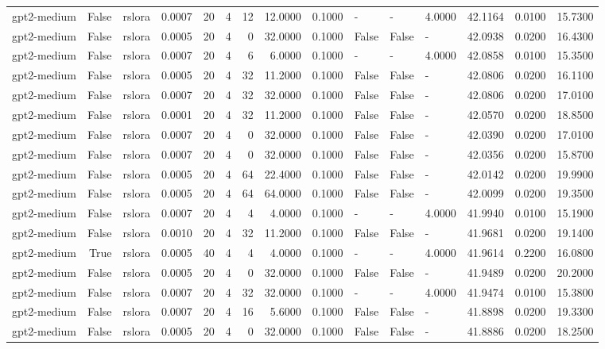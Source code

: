\begin{tabular}{lrlrrrrrrlllrrr}
gpt2-medium & False & rslora & 0.0007 & 20 & 4 & 12 & 12.0000 & 0.1000 & - & - & 4.0000 & 42.1164 & 0.0100 & 15.7300 \\
gpt2-medium & False & rslora & 0.0005 & 20 & 4 & 0 & 32.0000 & 0.1000 & False & False & - & 42.0938 & 0.0200 & 16.4300 \\
gpt2-medium & False & rslora & 0.0007 & 20 & 4 & 6 & 6.0000 & 0.1000 & - & - & 4.0000 & 42.0858 & 0.0100 & 15.3500 \\
gpt2-medium & False & rslora & 0.0005 & 20 & 4 & 32 & 11.2000 & 0.1000 & False & False & - & 42.0806 & 0.0200 & 16.1100 \\
gpt2-medium & False & rslora & 0.0007 & 20 & 4 & 32 & 32.0000 & 0.1000 & False & False & - & 42.0806 & 0.0200 & 17.0100 \\
gpt2-medium & False & rslora & 0.0001 & 20 & 4 & 32 & 11.2000 & 0.1000 & False & False & - & 42.0570 & 0.0200 & 18.8500 \\
gpt2-medium & False & rslora & 0.0007 & 20 & 4 & 0 & 32.0000 & 0.1000 & False & False & - & 42.0390 & 0.0200 & 17.0100 \\
gpt2-medium & False & rslora & 0.0007 & 20 & 4 & 0 & 32.0000 & 0.1000 & False & False & - & 42.0356 & 0.0200 & 15.8700 \\
gpt2-medium & False & rslora & 0.0005 & 20 & 4 & 64 & 22.4000 & 0.1000 & False & False & - & 42.0142 & 0.0200 & 19.9900 \\
gpt2-medium & False & rslora & 0.0005 & 20 & 4 & 64 & 64.0000 & 0.1000 & False & False & - & 42.0099 & 0.0200 & 19.3500 \\
gpt2-medium & False & rslora & 0.0007 & 20 & 4 & 4 & 4.0000 & 0.1000 & - & - & 4.0000 & 41.9940 & 0.0100 & 15.1900 \\
gpt2-medium & False & rslora & 0.0010 & 20 & 4 & 32 & 11.2000 & 0.1000 & False & False & - & 41.9681 & 0.0200 & 19.1400 \\
gpt2-medium & True & rslora & 0.0005 & 40 & 4 & 4 & 4.0000 & 0.1000 & - & - & 4.0000 & 41.9614 & 0.2200 & 16.0800 \\
gpt2-medium & False & rslora & 0.0005 & 20 & 4 & 0 & 32.0000 & 0.1000 & False & False & - & 41.9489 & 0.0200 & 20.2000 \\
gpt2-medium & False & rslora & 0.0007 & 20 & 4 & 32 & 32.0000 & 0.1000 & - & - & 4.0000 & 41.9474 & 0.0100 & 15.3800 \\
gpt2-medium & False & rslora & 0.0007 & 20 & 4 & 16 & 5.6000 & 0.1000 & False & False & - & 41.8898 & 0.0200 & 19.3300 \\
gpt2-medium & False & rslora & 0.0005 & 20 & 4 & 0 & 32.0000 & 0.1000 & False & False & - & 41.8886 & 0.0200 & 18.2500 \\

\end{tabular}
